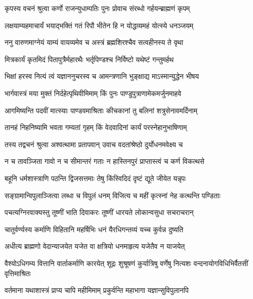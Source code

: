 \twolineshloka
{कृपस्य वचनं श्रुत्वा कर्णो राजन्युधाम्पतिः}
{पुनः प्रोवाच संरब्धो गर्हयन्ब्राह्मणं कृपम्}




\twolineshloka
{लक्षयाम्यहमाचार्यं भयाद्भक्तिं गतं रिपौ}
{भीतेन हि न योद्धव्यमहं योत्स्ये धनञ्जयम्}


\twolineshloka
{ननु वारुणमाग्नेयं याम्यं वायव्यमेव च}
{अस्त्रं ब्रह्मशिरश्चैव सत्वहीनस्य ते वृथा}


\twolineshloka
{मित्रकार्यं कृतमिदं पितापुत्रैर्महारथैः}
{भर्तृपिण्डश्च निर्विष्टो यथेष्टं गन्तुमर्हथ}


\twolineshloka
{भिक्षां हरस्व नित्यं त्वं यज्ञाननुचरस्व च}
{आमन्त्रणानि भुङ्क्षाद्य माऽस्मान्युद्धेन भीषय}


\twolineshloka
{भार्गवास्त्रं मया मुक्तं निर्दहेत्पृथिवीमिमाम्}
{किं पुनः पाण्डुपुत्राणामेकमर्जुनमाहवे}


\twolineshloka
{आगमिष्यन्ति पदवीं मात्स्याः पाण्डवमाश्रिताः}
{कीचकानां तु बलिनां शत्रुसेनावमर्दिनाम्}


\twolineshloka
{तानहं निहनिष्यामि भवता गम्यतां गृहम्}
{किं वेदवादिनां कार्यं परस्नेहानुभाषिणाम्}


\twolineshloka
{तस्य तद्वचनं श्रुत्वा अश्वत्थामा प्रतापवान्}
{उवाच वदतांश्रेष्ठो दुर्योधनमवेक्ष्य च}


\twolineshloka
{न च तावञ्जिता गावो न च सीमान्तरं गताः}
{न हास्तिनपुरं प्राप्तास्त्वं च कर्ण विकत्थसे}


\twolineshloka
{बहूनि धर्मशास्त्राणि पठन्ति द्विजसत्तमाः}
{तेषु किंस्विदिदं दृष्टं द्यूते जीयेत यन्नृपः}


\twolineshloka
{सङ्ग्रामान्विपुलाञ्जित्वा लब्धा च विपुलं धनम्}
{विजित्य च महीं कृत्स्नां नेह कत्थन्ति पण्डिताः}


\twolineshloka
{पचत्यग्निरवाक्यस्तु तूष्णीं भाति दिवाकरः}
{तूष्णीं धारयते लोकान्वसुधा सचराचरान्}


\twolineshloka
{चातुर्वर्ण्यस्य कर्माणि विहितानि महर्षिभिः}
{धनं यैरधिगन्तव्यं यच्च कुर्वन्न दुष्यति}


\twolineshloka
{अधीत्य ब्राह्मणो वेदान्याजयेत यजेत वा}
{क्षत्रियो धनमाहृत्य यजेतैव न याजयेत्}


\onelineshloka
{वैश्योऽधिगम्य वित्तानि वार्ताकर्माणि कारयेत्}
\twolineshloka
{शूद्रः शुश्रूषणं कुर्यात्रिषु वर्णेषु नित्यशः}
{वन्दनायोगविधिभिर्वैतसीं वृत्तिमाश्रितः}


\twolineshloka
{वर्तमाना यथाशास्त्रं प्राप्य चापि महीमिमाम्}
{प्रकुर्वन्ति महाभागा यज्ञान्सुविपुलानपि}


